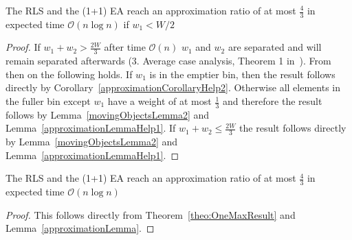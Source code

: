 \begin{lemma}\label{approximationLemma}
    The RLS and the (1+1) EA reach an approximation ratio of at most $\frac{4}{3}$ in expected time $\mathcal{O}(n\log{}n)$ if $w_1 < W/2$
\end{lemma}
\begin{proof}
    If \(w_1+w_2 > \frac{2W}{3}\) after time $\mathcal{O}(n)$ $w_1$ and $w_2$ are separated and will remain separated afterwards (3. Average case analysis, Theorem 1 in~\cite{witt2005worst}).
    From then on the following holds.
    If $w_1$ is in the emptier bin, then the result follows directly by Corollary~\ref{approximationCorollaryHelp2}.
    Otherwise all elements in the fuller bin except $w_1$ have a weight of at most $\frac{1}{3}$ and therefore the result follows by Lemma~\ref{movingObjectsLemma2} and Lemma~\ref{approximationLemmaHelp1}.
    If \(w_1+w_2 \le \frac{2W}{3}\) the result follows directly by Lemma~\ref{movingObjectsLemma2} and Lemma~\ref{approximationLemmaHelp1}.
\end{proof}

\begin{corollary}
    The RLS and the (1+1) EA reach an approximation ratio of at most $\frac{4}{3}$ in expected time $\mathcal{O}(n\log{}n)$
\end{corollary}
\begin{proof}
    This follows directly from Theorem~\ref{theo:OneMaxResult} and Lemma~\ref{approximationLemma}.
\end{proof}


